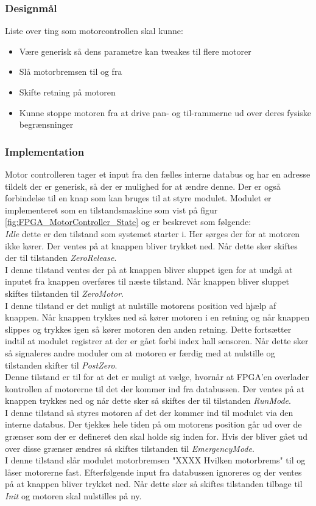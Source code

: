 \subsubsection{Designmål}
Liste over ting som motorcontrollen skal kunne:
\begin{itemize}[noitemsep]
	\item Være generisk så dens parametre kan tweakes til flere motorer
	\item Slå motorbremsen til og fra
	\item Skifte retning på motoren
	\item Kunne stoppe motoren fra at drive pan- og til-rammerne ud over deres fysiske begrænsninger
\end{itemize}

\subsubsection{Implementation}
Motor controlleren tager et input fra den fælles interne databus og har en adresse tildelt der er generisk, så der er mulighed for at ændre denne. Der er også forbindelse til en knap som kan bruges til at styre modulet. Modulet er implementeret som en tilstandsmaskine som vist på figur \ref{fig:FPGA_MotorController_State} og er beskrevet som følgende:\\
\textit{Idle} dette er den tilstand som systemet starter i. Her sørges der for at motoren ikke kører. Der ventes på at knappen bliver trykket ned. Når dette sker skiftes der til tilstanden \textit{ZeroRelease}.\\
I denne tilstand ventes der på at knappen bliver sluppet igen for at undgå at inputet fra knappen overføres til næste tilstand. Når knappen bliver sluppet skiftes tilstanden til \textit{ZeroMotor}.\\ 
I denne tilstand er det muligt at nulstille motorens position ved hjælp af knappen. Når knappen trykkes ned så kører motoren i en retning og når knappen slippes og trykkes igen så kører motoren den anden retning. Dette fortsætter indtil at modulet registrer at der er gået forbi index hall sensoren. Når dette sker så signaleres andre moduler om at motoren er færdig med at nulstille og tilstanden skifter til \textit{PostZero}.\\
Denne tilstand er til for at det er muligt at vælge, hvornår at FPGA'en overlader kontrollen af motorerne til det der kommer ind fra databussen. Der ventes på at knappen trykkes ned og når dette sker så skiftes der til tilstanden \textit{RunMode}. \\
I denne tilstand så styres motoren af det der kommer ind til modulet via den interne databus. Der tjekkes hele tiden på om motorens position går ud over de grænser som der er defineret den skal holde sig inden for. Hvis der bliver gået ud over disse grænser ændres så skiftes tilstanden til \textit{EmergencyMode}.\\
I denne tilstand slår modulet motorbremsen "XXXX Hvilken motorbrems" til og låser motorerne fast. Efterfølgende input fra databussen ignoreres og der ventes på at knappen bliver trykket ned. Når dette sker så skiftes tilstanden tilbage til \textit{Init} og motoren skal nulstilles på ny.


